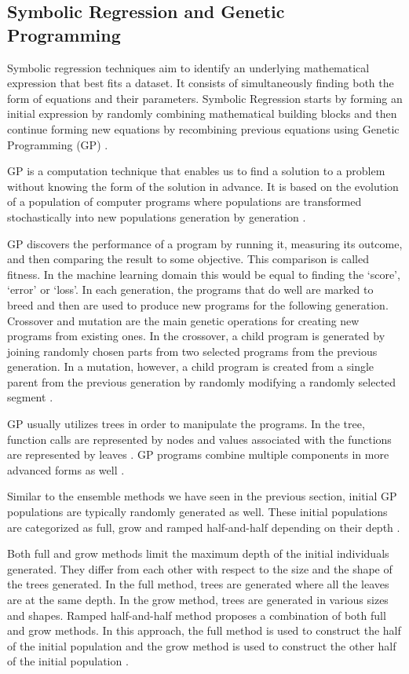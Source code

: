 \documentclass[journal]{IEEEtran}
\begin{document}
\subsection{Symbolic Regression and Genetic Programming}
\label{section:GeneticProgramming}
Symbolic regression techniques aim to identify an underlying mathematical expression that best fits a dataset. It consists of simultaneously finding both the form of equations and their parameters. Symbolic Regression starts by forming an initial expression by randomly combining mathematical building blocks and then continue forming new equations by recombining previous equations using Genetic Programming (GP) \cite{schmidt2010symbolic}.

GP is a computation technique that enables us to find a solution to a problem without knowing the form of the solution in advance. It is based on the evolution of a population of computer programs where populations are transformed stochastically into new populations generation by generation \cite{poli2008field}.

GP discovers the performance of a program by running it, measuring its outcome, and then comparing the result to some objective. This comparison is called fitness. In the machine learning domain this would be equal to finding the ‘score’, ‘error’ or ‘loss’. In each generation, the programs that do well are marked to breed and then are used to produce new programs for the following generation. Crossover and mutation are the main genetic operations for creating new programs from existing ones. In the crossover, a child program is generated by joining randomly chosen parts from two selected programs from the previous generation. In a mutation, however, a child program is created from a single parent from the previous generation by randomly modifying a randomly selected segment \cite{poli2008field}.

GP usually utilizes trees in order to manipulate the programs. In the tree, function calls are represented by nodes and values associated with the functions are represented by leaves \cite{koza1992genetic}. GP programs combine multiple components in more advanced forms as well \cite{poli2008field}.

Similar to the ensemble methods we have seen in the previous section, initial GP populations are typically randomly generated as well. These initial populations are categorized as full, grow and ramped half-and-half depending on their depth \cite{poli2008field}.

Both full and grow methods limit the maximum depth of the initial individuals generated. They differ from each other with respect to the size and the shape of the trees generated. In the full method, trees are generated where all the leaves are at the same depth. In the grow method, trees are generated in various sizes and shapes. Ramped half-and-half method proposes a combination of both full and grow methods. In this approach, the full method is used to construct the half of the initial population and the grow method is used to construct the other half of the initial population \cite{poli2008field}.
\end{document}

